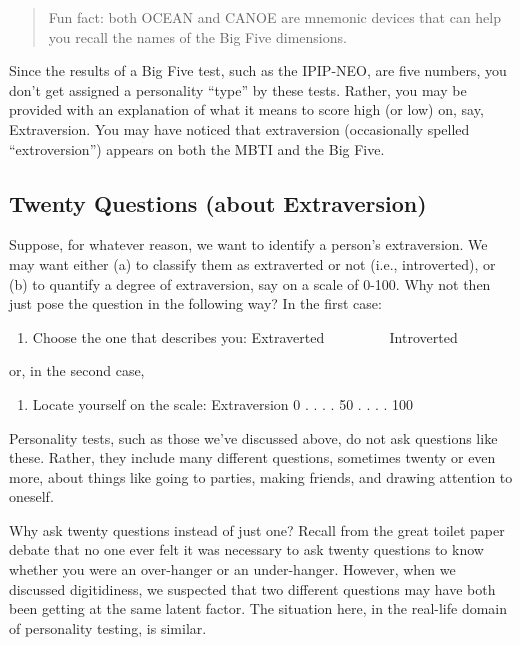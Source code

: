 \documentclass[openany]{book}
\providecommand{\tightlist}{%
  \setlength{\itemsep}{0pt}\setlength{\parskip}{0pt}}
\begin{document}
\begin{quote}
Fun fact: both OCEAN and CANOE are mnemonic devices that can help you recall the names of the Big Five dimensions.
\end{quote}

Since the results of a Big Five test, such as the IPIP-NEO, are five numbers, you don't get assigned a personality ``type'' by these tests. Rather, you may be provided with an explanation of what it means to score high (or low) on, say, Extraversion. You may have noticed that extraversion (occasionally spelled ``extroversion'') appears on both the MBTI and the Big Five.

\hypertarget{twenty-questions-about-extraversion}{%
\subsection*{Twenty Questions (about Extraversion)}\label{twenty-questions-about-extraversion}}

Suppose, for whatever reason, we want to identify a person's extraversion. We may want either (a) to classify them as extraverted or not (i.e., introverted), or (b) to quantify a degree of extraversion, say on a scale of 0-100. Why not then just pose the question in the following way? In the first case:

\begin{enumerate}
\def\labelenumi{\alph{enumi})}
\tightlist
\item
  Choose the one that describes you: Extraverted ~~~~\textbar{} ~~~~Introverted
\end{enumerate}

or, in the second case,

\begin{enumerate}
\def\labelenumi{\alph{enumi})}
\setcounter{enumi}{1}
\tightlist
\item
  Locate yourself on the scale: Extraversion 0 . . . . 50 . . . . 100
\end{enumerate}

Personality tests, such as those we've discussed above, do not ask questions like these. Rather, they include many different questions, sometimes twenty or even more, about things like going to parties, making friends, and drawing attention to oneself.

Why ask twenty questions instead of just one? Recall from the great toilet paper debate that no one ever felt it was necessary to ask twenty questions to know whether you were an over-hanger or an under-hanger. However, when we discussed digitidiness, we suspected that two different questions may have both been getting at the same latent factor. The situation here, in the real-life domain of personality testing, is similar.
\end{document}
